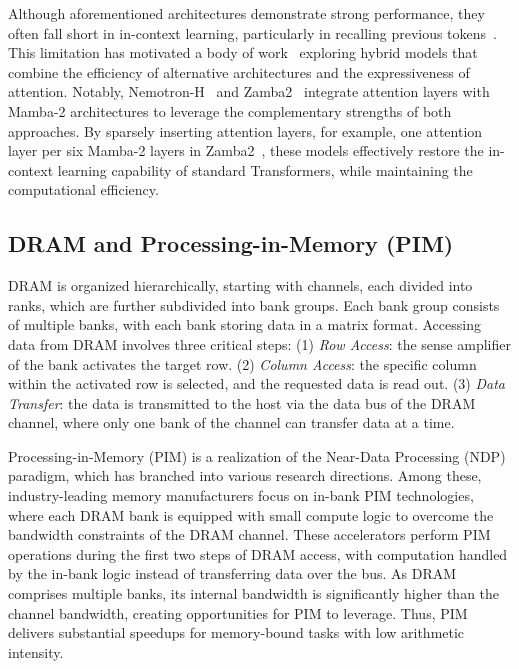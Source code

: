 %
%
Although aforementioned architectures demonstrate strong performance,
they often fall short in in-context learning, particularly in
recalling previous tokens~\cite{nvidia-mamba2}.
%
This limitation has motivated a body of work~\cite{nemotron-h,
zamba2, hymba, samba, nvidia-mamba2} exploring hybrid models that
combine the efficiency of alternative architectures and the
expressiveness of attention.
%
Notably, Nemotron-H~\cite{nemotron-h} and Zamba2~\cite{zamba2}
integrate attention layers with Mamba-2 architectures to leverage the
complementary strengths of both approaches.
%
By sparsely inserting attention layers, for example, one attention
layer per six Mamba-2 layers in Zamba2~\cite{zamba2}, these models
effectively restore the in-context learning capability of standard
Transformers, while maintaining the computational efficiency.
%

\subsection{DRAM and Processing-in-Memory (PIM)}

%
DRAM is organized hierarchically, starting with channels, each
divided into ranks, which are further subdivided into bank groups.
%
Each bank group consists of multiple banks, with each bank storing
data in a matrix format.
%
Accessing data from DRAM involves three critical steps:
%
(1) \emph{Row Access}: the sense amplifier of the bank activates the target row.
%
(2) \emph{Column Access}: the specific column within the activated
row is selected, and the requested data is read out.
%
(3) \emph{Data Transfer}: the data is transmitted to the host via the
data bus of the DRAM channel, where only one bank of the channel can
transfer data at a time.
%

%
%
Processing-in-Memory (PIM) is a realization of the Near-Data
Processing (NDP) paradigm, which has branched into various research directions.
%
Among these, industry-leading memory manufacturers focus on in-bank
PIM technologies, where each DRAM bank is equipped with small compute
logic to overcome the bandwidth constraints of the DRAM channel.
%
These accelerators perform PIM operations during the first two steps
of DRAM access, with computation handled by the in-bank logic instead
of transferring data over the bus.
%
As DRAM comprises multiple banks, its internal bandwidth is
significantly higher than the channel bandwidth, creating
opportunities for PIM to leverage.
%
Thus, PIM delivers substantial speedups for memory-bound tasks with
low arithmetic intensity.
%
